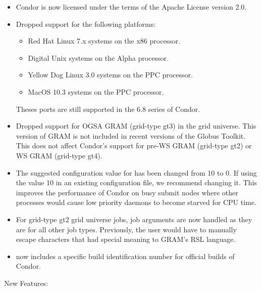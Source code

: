 \begin{itemize}

\item Condor is now licensed under the terms of the Apache License
  version 2.0.

\item Dropped support for the following platforms:
\begin{itemize}
\item Red Hat Linux 7.x systems on the x86 processor.
\item Digital Unix systems on the Alpha processor.
\item Yellow Dog Linux 3.0 systems on the PPC processor.
\item MacOS 10.3 systems on the PPC processor.
\end{itemize}
Theses ports are still supported in the 6.8 series of Condor.

\item Dropped support for OGSA GRAM (grid-type gt3) in the grid
universe. This version of GRAM is not included in recent versions of
the Globus Toolkit. This does not affect Condor's support for pre-WS
GRAM (grid-type gt2) or WS GRAM (grid-type gt4).

\item The suggested configuration value for
 has been changed from 10 to 0.  If
using the value 10 in an existing configuration file, we recommend
changing it.  This improves the performance of Condor on busy submit nodes
where other processes would cause low priority  daemons
to become starved for CPU time.

\item For grid-type gt2 grid universe jobs, job arguments are now handled
as they are for all other job types. Previously, the user would have to
manually escape characters that had special meaning to GRAM's RSL
language.

\item {} now includes a specific build
identification number for official builds of Condor.

\end{itemize}


\noindent New Features:


